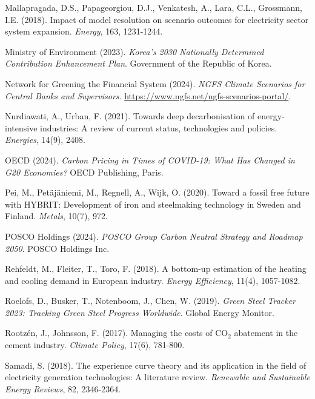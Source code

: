 \documentclass[preprint,1p,authoryear]{elsarticle}
\begin{document}
\begin{thebibliography}{99}
 Mallapragada, D.S., Papageorgiou, D.J., Venkatesh, A., Lara, C.L., Grossmann, I.E. (2018). Impact of model resolution on scenario outcomes for electricity sector system expansion. \textit{Energy}, 163, 1231-1244.

 Ministry of Environment (2023). \textit{Korea's 2030 Nationally Determined Contribution Enhancement Plan}. Government of the Republic of Korea.

 Network for Greening the Financial System (2024). \textit{NGFS Climate Scenarios for Central Banks and Supervisors}. \url{https://www.ngfs.net/ngfs-scenarios-portal/}.

 Nurdiawati, A., Urban, F. (2021). Towards deep decarbonisation of energy-intensive industries: A review of current status, technologies and policies. \textit{Energies}, 14(9), 2408.

 OECD (2024). \textit{Carbon Pricing in Times of COVID-19: What Has Changed in G20 Economies?} OECD Publishing, Paris.

 Pei, M., Petäjäniemi, M., Regnell, A., Wijk, O. (2020). Toward a fossil free future with HYBRIT: Development of iron and steelmaking technology in Sweden and Finland. \textit{Metals}, 10(7), 972.

 POSCO Holdings (2024). \textit{POSCO Group Carbon Neutral Strategy and Roadmap 2050}. POSCO Holdings Inc.

 Rehfeldt, M., Fleiter, T., Toro, F. (2018). A bottom-up estimation of the heating and cooling demand in European industry. \textit{Energy Efficiency}, 11(4), 1057-1082.

 Roelofs, D., Busker, T., Notenboom, J., Chen, W. (2019). \textit{Green Steel Tracker 2023: Tracking Green Steel Progress Worldwide}. Global Energy Monitor.

 Rootzén, J., Johnsson, F. (2017). Managing the costs of CO$_2$ abatement in the cement industry. \textit{Climate Policy}, 17(6), 781-800.

 Samadi, S. (2018). The experience curve theory and its application in the field of electricity generation technologies: A literature review. \textit{Renewable and Sustainable Energy Reviews}, 82, 2346-2364.


\end{thebibliography}
\end{document}
